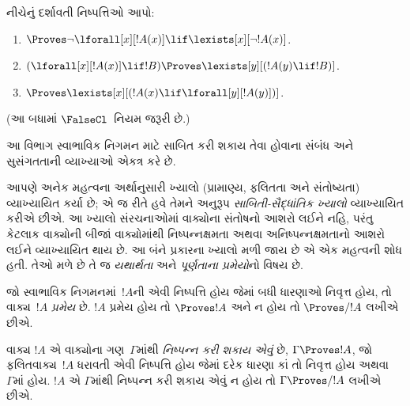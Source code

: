 \begin{prob}
નીચેનું દર્શાવતી નિષ્પત્તિઓ આપો:
\begin{enumerate}
\item $\Proves \lnot\lforall[x][!A(x)] \lif \lexists[x][\lnot!A(x)]$.
\item $(\lforall[x][!A(x)] \lif !B) \Proves \lexists[y][(!A(y) \lif !B)]$.
\item $\Proves \lexists[x][(!A(x) \lif \lforall[y][!A(y)])]$.
\end{enumerate}
(આ બધામાં $\FalseCl$~નિયમ જરૂરી છે.)
\end{prob}
\endgroup


\begingroup
\makeatletter{}\makeatother


\label{guunit:OLP-0091}


\begin{editorial}
આ વિભાગ સ્વાભાવિક નિગમન માટે સાબિત કરી શકાય તેવા હોવાના સંબંધ અને
સુસંગતતાની વ્યાખ્યાઓ એકત્ર કરે છે.
\end{editorial}

\begin{explain}
આપણે અનેક મહત્વના અર્થાનુસારી ખ્યાલો (પ્રામાણ્ય, ફલિતતા અને સંતોષ્યતા)
વ્યાખ્યાયિત કર્યા છે; એ જ રીતે હવે તેમને અનુરૂપ \emph{સાબિતી-સૈદ્ધાંતિક
ખ્યાલો} વ્યાખ્યાયિત કરીએ છીએ. આ ખ્યાલો સંરચનાઓમાં વાક્યોના
સંતોષનો આશરો લઈને નહિ, પરંતુ કેટલાક વાક્યોની બીજાં વાક્યોમાંથી
નિષ્પન્નક્ષમતા અથવા અનિષ્પન્નક્ષમતાનો આશરો લઈને વ્યાખ્યાયિત થાય છે.
આ બંને પ્રકારના ખ્યાલો મળી જાય છે એ એક મહત્વની શોધ હતી. તેઓ મળે છે તે
જ \emph{યથાર્થતા} અને \emph{પૂર્ણતાના પ્રમેયો}નો વિષય છે.
\end{explain}


\begin{defn}[પ્રમેયો]
જો સ્વાભાવિક નિગમનમાં~$!A$ની એવી નિષ્પત્તિ હોય જેમાં બધી ધારણાઓ
નિવૃત્ત હોય, તો વાક્ય~$!A$ \emph{પ્રમેય} છે. $!A$
પ્રમેય હોય તો $\Proves !A$ અને ન હોય તો $\Proves/ !A$ લખીએ છીએ.
\end{defn}

\begin{defn}[નિષ્પન્નક્ષમતા]
વાક્ય $!A$ એ વાક્યોના ગણ~$\Gamma$માંથી
\emph{નિષ્પન્ન કરી શકાય એવું} છે, $\Gamma \Proves !A$, જો ફલિતવાક્ય~$!A$ ધરાવતી
એવી નિષ્પત્તિ હોય જેમાં દરેક ધારણા કાં તો નિવૃત્ત હોય અથવા
~$\Gamma$માં હોય. $!A$ એ $\Gamma$માંથી નિષ્પન્ન કરી શકાય એવું ન હોય તો
$\Gamma \Proves/ !A$ લખીએ છીએ.
\end{defn}

